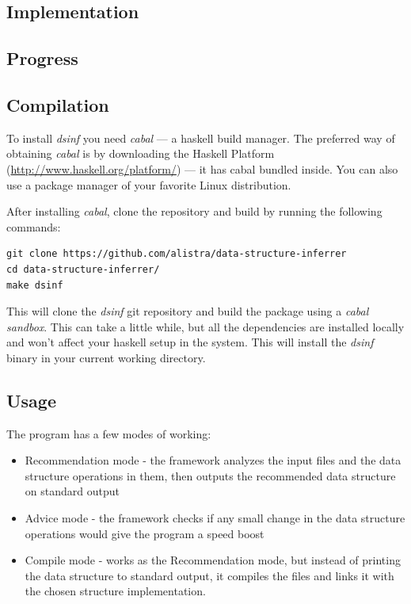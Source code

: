 \documentclass[a4paper,11pt]{article}
\begin{document}
\newpage
\begin{appendices}
\section{Implementation}
	\subsection{Progress}
	\subsection{Compilation}
	To install \emph{dsinf} you need \emph{cabal} --- a haskell build manager. The preferred way of obtaining
	\emph{cabal} is by downloading the Haskell Platform (\href{http://www.haskell.org/platform/}{http://www.haskell.org/platform/})
	--- it has cabal bundled inside. You can also use a package manager of your favorite Linux distribution.
	
	After installing \emph{cabal}, clone the repository and build by running the following commands:
	  	\begin{lstlisting}
git clone https://github.com/alistra/data-structure-inferrer
cd data-structure-inferrer/
make dsinf
		\end{lstlisting}
	This will clone the \emph{dsinf} git repository and build the package using a \emph{cabal sandbox}.
	This can take a little while, but all the dependencies are installed locally and won't affect your 
	haskell setup in the system. This will install the \emph{dsinf} binary in your current working directory.
	\subsection{Usage}

	The program has a few modes of working:
	\begin{itemize}
		\item Recommendation mode - the framework analyzes the input files and the data structure operations in
			them, then outputs the recommended data structure on standard output
		\item Advice mode - the framework checks if any small change in the data structure operations would give
			the program a speed boost
		\item Compile mode - works as the Recommendation mode, but instead of printing the data structure to
			standard output, it compiles the files and links it with the chosen structure implementation.
	\end{itemize}
	

\end{appendices}
\end{document}
